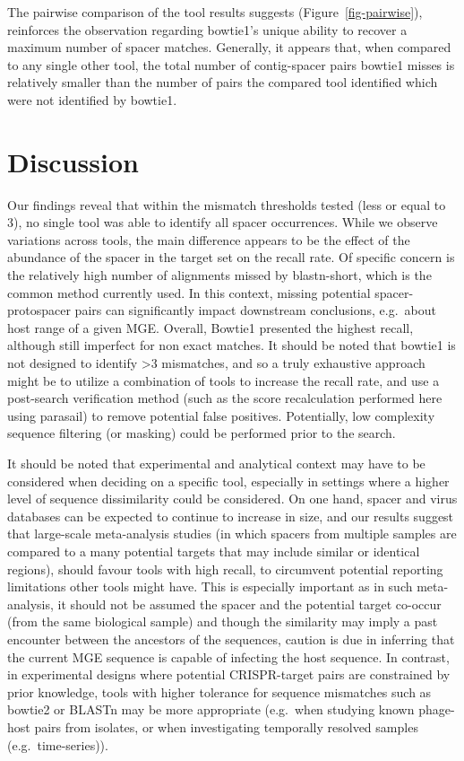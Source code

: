 \documentclass[
]{article}
\begin{document}
The pairwise comparison of the tool results suggests
(Figure~\ref{fig-pairwise}), reinforces the observation regarding
bowtie1's unique ability to recover a maximum number of spacer matches.
Generally, it appears that, when compared to any single other tool, the
total number of contig-spacer pairs bowtie1 misses is relatively smaller
than the number of pairs the compared tool identified which were not
identified by bowtie1.

\section{Discussion}\label{discussion}

Our findings reveal that within the mismatch thresholds tested (less or
equal to 3), no single tool was able to identify all spacer occurrences.
While we observe variations across tools, the main difference appears to
be the effect of the abundance of the spacer in the target set on the
recall rate. Of specific concern is the relatively high number of
alignments missed by blastn-short, which is the common method currently
used. In this context, missing potential spacer-protospacer pairs can
significantly impact downstream conclusions, e.g.~about host range of a
given MGE. Overall, Bowtie1 presented the highest recall, although still
imperfect for non exact matches. It should be noted that bowtie1 is not
designed to identify \textgreater3 mismatches, and so a truly exhaustive
approach might be to utilize a combination of tools to increase the
recall rate, and use a post-search verification method (such as the
score recalculation performed here using parasail) to remove potential
false positives. Potentially, low complexity sequence filtering (or
masking) could be performed prior to the search.

It should be noted that experimental and analytical context may have to
be considered when deciding on a specific tool, especially in settings
where a higher level of sequence dissimilarity could be considered. On
one hand, spacer and virus databases can be expected to continue to
increase in size, and our results suggest that large-scale meta-analysis
studies (in which spacers from multiple samples are compared to a many
potential targets that may include similar or identical regions), should
favour tools with high recall, to circumvent potential reporting
limitations other tools might have. This is especially important as in
such meta-analysis, it should not be assumed the spacer and the
potential target co-occur (from the same biological sample) and though
the similarity may imply a past encounter between the ancestors of the
sequences, caution is due in inferring that the current MGE sequence is
capable of infecting the host sequence. In contrast, in experimental
designs where potential CRISPR-target pairs are constrained by prior
knowledge, tools with higher tolerance for sequence mismatches such as
bowtie2 or BLASTn may be more appropriate (e.g.~when studying known
phage-host pairs from isolates, or when investigating temporally
resolved samples (e.g.~time-series)).
\end{document}
